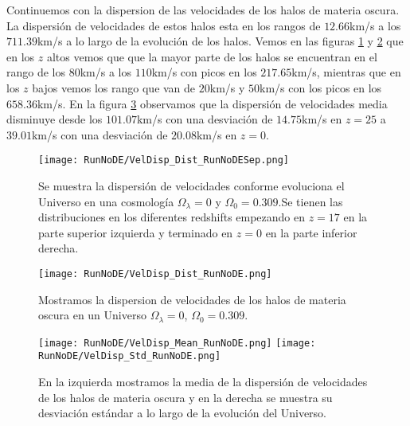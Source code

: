 Continuemos con la dispersion de las velocidades de los halos de materia oscura. La dispersión de velocidades de estos halos esta en los rangos de $12.66$km/s a los $711.39$km/s a lo largo de la evolución de los halos. Vemos en las figuras \ref{fig:NoDE-VelDispDistSep} y \ref{fig:NoDE-VelDispDist} que en los $z$ altos vemos que que la mayor parte de los halos se encuentran en el rango de los $80$km/s a los $110$km/s con picos en los $217.65$km/s, mientras que en los $z$ bajos vemos los rango que van de $20$km/s y $50$km/s con los picos en los $658.36$km/s. En la figura \ref{fig:NoDE-VelDispStats} observamos que la dispersión de velocidades media disminuye desde los $101.07$km/s con una desviación de $14.75$km/s en $z=25$ a $39.01$km/s con una desviación de $20.08$km/s en $z=0$.

\begin{figure}[H]
    \centering
    \texttt{[image: RunNoDE/VelDisp\_Dist\_RunNoDESep.png]}
    \caption[Dispersión de velocidades]{\footnotesize Se muestra la dispersión de velocidades conforme evoluciona el Universo en una cosmología $\Omega_\lambda = 0$ y $\Omega_0 = 0.309$.Se tienen las distribuciones en los diferentes redshifts empezando en $z=17$ en la parte superior izquierda y terminado en $z=0$ en la parte inferior derecha.}
    \label{fig:NoDE-VelDispDistSep}
\end{figure}

\begin{figure}[H]
    \centering
    \texttt{[image: RunNoDE/VelDisp\_Dist\_RunNoDE.png]}
    \caption[Distribución de la dispersión de velocidades]{\footnotesize Mostramos la dispersion de velocidades de los halos de materia oscura en un Universo $\Omega_\lambda = 0$, $\Omega_0 = 0.309$.}
    \label{fig:NoDE-VelDispDist}
\end{figure}

\begin{figure}[H]
    \centering
    \texttt{[image: RunNoDE/VelDisp\_Mean\_RunNoDE.png]}
    \texttt{[image: RunNoDE/VelDisp\_Std\_RunNoDE.png]}
    \caption[Media y desviación estándar de la dispersión de velocidades]{\footnotesize En la izquierda mostramos la media de la dispersión de velocidades de los halos de materia oscura y en la derecha se muestra su desviación estándar a lo largo de la evolución del Universo.}
    \label{fig:NoDE-VelDispStats}
\end{figure}

